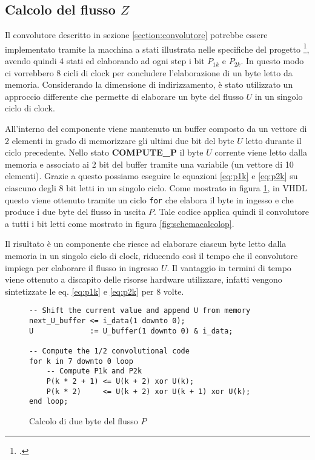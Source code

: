 \subsection{Calcolo del flusso \texorpdfstring{$Z$}{}}
\label{section:calcolodiz}

Il convolutore descritto in sezione \ref{section:convolutore} potrebbe essere implementato tramite la macchina a stati illustrata nelle specifiche del progetto \footcite{specifichedelprogetto}, avendo quindi 4 stati ed elaborando ad ogni step i bit $P_{1k}$ e $P_{2k}$. In questo modo ci vorrebbero 8 cicli di clock per concludere l'elaborazione di un byte letto da memoria. Considerando la dimensione di indirizzamento, è stato utilizzato un approccio differente che permette di elaborare un byte del flusso $U$ in un singolo ciclo di clock.

All'interno del componente viene mantenuto un buffer composto da un vettore di 2 elementi in grado di memorizzare gli ultimi due bit del byte $U$ letto durante il ciclo precedente. Nello stato \textbf{COMPUTE\_P} il byte $U$ corrente viene letto dalla memoria e associato ai 2 bit del buffer tramite una variabile (un vettore di 10 elementi). Grazie a questo possiamo eseguire le equazioni \ref{eq:p1k} e \ref{eq:p2k} su ciascuno degli 8 bit letti in un singolo ciclo. Come mostrato in figura \ref{code:calcolop}, in VHDL questo viene ottenuto tramite un ciclo \verb|for| che elabora il byte in ingesso e che produce i due byte del flusso in uscita $P$. Tale codice applica quindi il convolutore a tutti i bit letti come mostrato in figura \ref{fig:schemacalcolop}.

Il risultato è un componente che riesce ad elaborare ciascun byte letto dalla memoria in un singolo ciclo di clock, riducendo così il tempo che il convolutore impiega per elaborare il flusso in ingresso $U$. Il vantaggio in termini di tempo viene ottenuto a discapito delle risorse hardware utilizzare, infatti vengono sintetizzate le eq. \ref{eq:p1k} e \ref{eq:p2k} per 8 volte.

\begin{figure}[!ht]
    \centering
    \begin{varwidth}{\linewidth}
        \begin{verbatim}
-- Shift the current value and append U from memory
next_U_buffer <= i_data(1 downto 0);
U             := U_buffer(1 downto 0) & i_data;

-- Compute the 1/2 convolutional code
for k in 7 downto 0 loop
    -- Compute P1k and P2k
    P(k * 2 + 1) <= U(k + 2) xor U(k);
    P(k * 2)     <= U(k + 2) xor U(k + 1) xor U(k);
end loop;
    \end{verbatim}
    \end{varwidth}
    \caption{Calcolo di due byte del flusso $P$}
    \label{code:calcolop}
\end{figure}


